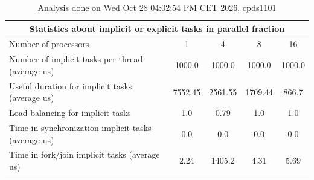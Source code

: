 \begin{table}[h]
\begin{center}
\begin{tabular}{|l|c|c|c|c|}
\hline
\multicolumn{5}{|c|}{Statistics about implicit or explicit tasks in parallel fraction} \\
\hline
\hline
Number of processors & 1 & 4 & 8 & 16 \\
\hline
\hline
Number of implicit tasks per thread (average us)    &          1000.0 &          1000.0 &          1000.0 &          1000.0 \\
\hline
Useful duration for implicit tasks (average us)     &         7552.45 &         2561.55 &         1709.44 &           866.7 \\
\hline
Load balancing for implicit tasks                &             1.0 &            0.79 &             1.0 &             1.0 \\
\hline
Time in synchronization implicit tasks (average us) &             0.0 &             0.0 &             0.0 &             0.0 \\
\hline
Time in fork/join implicit tasks (average us)       &            2.24 &          1405.2 &            4.31 &            5.69 \\
\hline
\end{tabular}
\end{center}
\caption{ Analysis done on Wed Oct 28 04:02:54 PM CET 2026, cpds1101}
\end{table}
